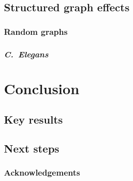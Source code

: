 \documentclass[pdflatex,lineno,referee,sn-mathphys-ay]{class/sn-jnl}
\begin{document}
\subsection{Structured graph effects}
\subsubsection{Random graphs}
\subsubsection{\emph{C.\ Elegans}}

\section{Conclusion}
\subsection{Key results}
\subsection{Next steps}

\subsubsection{Acknowledgements}

\backmatter


\end{document}
